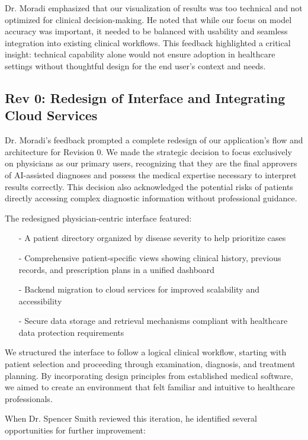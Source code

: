\documentclass{article}
\begin{document}
Dr. Moradi emphasized that our visualization of results was too technical and not optimized for clinical decision-making. He noted that while our focus on model accuracy was important, it needed to be balanced with usability and seamless integration into existing clinical workflows. This feedback highlighted a critical insight: technical capability alone would not ensure adoption in healthcare settings without thoughtful design for the end user's context and needs.

\subsection{Rev 0: Redesign of Interface and Integrating Cloud Services}

Dr. Moradi's feedback prompted a complete redesign of our application's flow and architecture for Revision 0. We made the strategic decision to focus exclusively on physicians as our primary users, recognizing that they are the final approvers of AI-assisted diagnoses and possess the medical expertise necessary to interpret results correctly. This decision also acknowledged the potential risks of patients directly accessing complex diagnostic information without professional guidance.

The redesigned physician-centric interface featured:

\begin{itemize}
    \item[-] A patient directory organized by disease severity to help prioritize cases
    \item[-] Comprehensive patient-specific views showing clinical history, previous records, and prescription plans in a unified dashboard
    \item[-] Backend migration to cloud services for improved scalability and accessibility
    \item[-] Secure data storage and retrieval mechanisms compliant with healthcare data protection requirements
\end{itemize}

We structured the interface to follow a logical clinical workflow, starting with patient selection and proceeding through examination, diagnosis, and treatment planning. By incorporating design principles from established medical software, we aimed to create an environment that felt familiar and intuitive to healthcare professionals.

When Dr. Spencer Smith reviewed this iteration, he identified several opportunities for further improvement:
\end{document}
